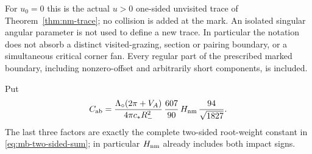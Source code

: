 For $u_0=0$ this is the actual $u>0$ one-sided unvisited trace of
Theorem~\ref{thm:nm-trace}; no collision is added at the mark.
An isolated singular angular parameter is not used to define a
new trace.  In particular the notation does not absorb a distinct
visited-grazing, section or pairing boundary, or a simultaneous
critical corner fan.  Every regular part of the prescribed marked
boundary, including nonzero-offset and arbitrarily short components,
is included.

Put
\begin{equation}\label{eq:ab-final-constant}
 C_{\rm ab}
    =\frac{\Lambda_\circ(2\pi+V_A)}{4\pi c_*R_-^2}\,
       \frac{607}{90}\,H_{\rm nm}\,\frac{94}{\sqrt{1827}}.
\end{equation}
The last three factors are exactly the complete two-sided root-weight
constant in \eqref{eq:mb-two-sided-sum}; in particular $H_{\rm nm}$
already includes both impact signs.

